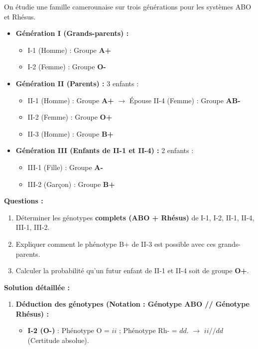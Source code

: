 \documentclass[11pt]{article}
\begin{document}
\begin{exoresolu}
On étudie une famille camerounaise sur trois générations pour les systèmes ABO et Rhésus.
\begin{itemize}
    \item \textbf{Génération I (Grands-parents) :} 
        \begin{itemize}
            \item I-1 (Homme) : Groupe \textbf{A+} 
            \item I-2 (Femme) : Groupe \textbf{O-}
        \end{itemize}
    \item \textbf{Génération II (Parents) :} 3 enfants :
        \begin{itemize}
            \item II-1 (Homme) : Groupe \textbf{A+} $\rightarrow$ Épouse II-4 (Femme) : Groupe \textbf{AB-}
            \item II-2 (Femme) : Groupe \textbf{O+}
            \item II-3 (Homme) : Groupe \textbf{B+}
        \end{itemize}
    \item \textbf{Génération III (Enfants de II-1 et II-4) :} 2 enfants :
        \begin{itemize}
            \item III-1 (Fille) : Groupe \textbf{A-}
            \item III-2 (Garçon) : Groupe \textbf{B+}
        \end{itemize}
\end{itemize}
\textbf{Questions :}
\begin{enumerate}
    \item Déterminer les génotypes \textbf{complets (ABO + Rhésus)} de I-1, I-2, II-1, II-4, III-1, III-2.
    \item Expliquer comment le phénotype B+ de II-3 est possible avec ces grands-parents.
    \item Calculer la probabilité qu'un futur enfant de II-1 et II-4 soit de groupe \textbf{O+}.
\end{enumerate}
\tcblower
\textbf{Solution détaillée :}
\begin{enumerate}
    \item \textbf{Déduction des génotypes (Notation : Génotype ABO // Génotype Rhésus) :}
    \begin{itemize}
        \item \textbf{I-2 (O-)} : Phénotype O = $ii$ ; Phénotype Rh- = $dd$. $\rightarrow$ \textbf{$ii // dd$} (Certitude absolue).

\end{itemize}
\end{enumerate}
\end{exoresolu}
\end{document}
